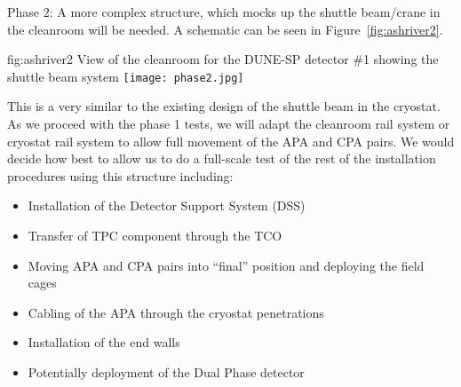 Phase 2: A more complex structure, which mocks up the shuttle
beam/crane in the cleanroom will be needed. A schematic can be seen in
Figure~\ref{fig:ashriver2}.
\begin{dunefigure}{fig:ashriver2}
  {View of the cleanroom for the DUNE-SP detector \#1 showing the shuttle beam system}
  \texttt{[image: phase2.jpg]}
\end{dunefigure}
This is a very similar to the existing
design of the shuttle beam in the cryostat.  As we proceed with the
phase 1 tests, we will adapt the cleanroom rail system or cryostat
rail system to allow full movement of the APA and CPA pairs. We would
decide how best to allow us to do a full-scale test of the rest of the
installation procedures using this structure including:
\begin{itemize}
 \item Installation of the Detector Support System (DSS)
 \item Transfer of TPC component through the TCO
 \item Moving APA and CPA pairs into ``final'' position and deploying the field cages
 \item Cabling of the APA through the cryostat penetrations
 \item Installation of the end walls
 \item Potentially deployment of the Dual Phase detector
\end{itemize}
